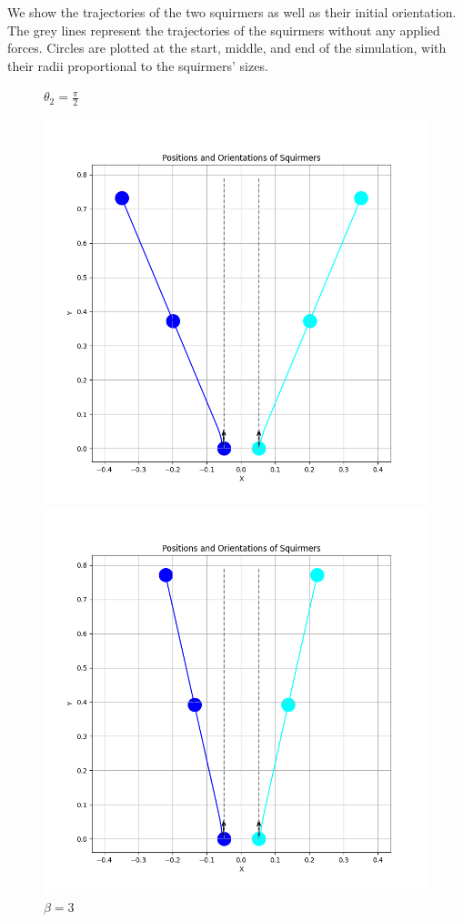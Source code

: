 \documentclass{article}
\begin{document}
 We show the trajectories of the two squirmers as well as their initial orientation. The grey lines 
 represent the trajectories of the squirmers without any applied forces. Circles are plotted at the start, 
 middle, and end of the simulation, with their radii proportional to the squirmers' sizes.
\newpage
 \begin{figure}[H]
    \centering
    \textbf{$\theta_2 = \frac{\pi}{2}$}\par\medskip
    \begin{minipage}{0.49\textwidth}
        \includegraphics[width=1.1\textwidth]{graphs/simulations/sim_sq_sq/beta3/pi_2_.png}
        \caption{\footnotesize $\beta = 3$}
    \end{minipage}\hfill
    \begin{minipage}{0.49\textwidth}
        \includegraphics[width=1.1\textwidth]{graphs/simulations/sim_sq_sq/betam3/pi_2_.png}

\end{minipage}
\end{figure}
\end{document}
